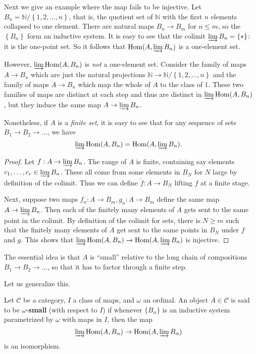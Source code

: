 \begin{example} 
Next we give an example where the map fails to be injective. Let $B_n =
\mathbb{N}/\left\{1,  2, \dots, n\right\}$, that is, the quotient set of
$\mathbb{N}$ with the first $n$ elements collapsed to one element.
There are natural maps $B_n \to B_m$ for $n \leq m$, so the
$\left\{B_n\right\}$ form an inductive system. It is easy to see that the
colimit $\varinjlim B_n = \left\{\ast \right\}$: it is the one-point set.
So it follows that $\hom(A, \varinjlim B_n)$ is a one-element set.

However, $\varinjlim \hom(A , B_n)$ is \emph{not} a one-element set. 
Consider the family of maps $A \to B_n$ which are just the natural projections
$\mathbb{N} \to \mathbb{N}/\left\{1, 2, \dots, n\right\}$ and the family of
maps $A \to B_n$ which map the whole of $A$ to the class of $1$.
These two families of maps are distinct at each step and thus are distinct in
$\varinjlim \hom(A, B_n)$, but they induce the same map $A \to \varinjlim B_n$.
\end{example} 


Nonetheless, if $A$ is a \emph{finite set}, it is easy to see that for any
sequence of sets $B_1 \to B_2 \to \dots$, we have
\[ \varinjlim \hom(A, B_n) = \hom(A, \varinjlim B_n).  \]
\begin{proof} 
Let $f: A \to \varinjlim B_n$. The range of $A$ is finite, containing say
elements $c_1, \dots, c_r \in \varinjlim B_n$. These all come from some
elements in $B_N$ for $N$ large by definition of the colimit. Thus we can
define $\widetilde{f}: A \to B_N$ lifting $f$ at a finite stage.

Next, suppose two  maps $f_n: A \to B_m,
g_n : A \to B_m$  define the same map $A \to \varinjlim B_n$.
Then each of the finitely many elements of $A$ gets sent to the same point in
the colimit. By definition of the colimit for sets, there is $N \geq m$ such
that the finitely many elements of $A$ get sent to the same points in $B_N$
under $f$ and $g$. This shows that $\varinjlim \hom(A, B_n) \to \hom(A,
\varinjlim B_n)$ is injective.
\end{proof} 


The essential idea is that $A$ is ``small'' relative to the long chain of
compositions $B_1 \to B_2 \to \dots$, so that it has to factor through a
finite step.

Let us generalize this.

\begin{definition} 
Let $\mathcal{C}$ be a category, $I $ a class of maps, and $\omega$ an ordinal.
An object $A \in \mathcal{C}$ is said to be $\omega$-\textbf{small} (with
respect to $I$) if
whenever $\{B_\alpha\}$ is an inductive system parametrized by $\omega$ with
maps in $I$, then
the map
\[ \varinjlim \hom(A, B_\alpha) \to \hom(A, \varinjlim B_\alpha)  \]
is an isomorphism. 
\end{definition} 

